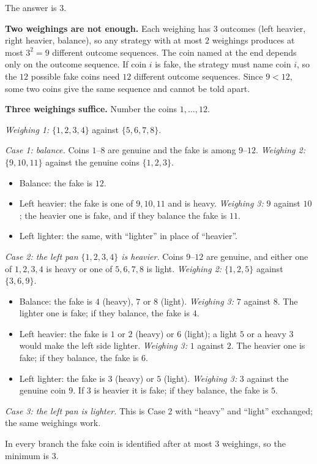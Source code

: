 The answer is $\boxed{3}$.

\textbf{Two weighings are not enough.} Each weighing has $3$ outcomes (left heavier, right heavier, balance), so any strategy with at most $2$ weighings produces at most $3^2=9$ different outcome sequences. The coin named at the end depends only on the outcome sequence. If coin $i$ is fake, the strategy must name coin $i$, so the $12$ possible fake coins need $12$ different outcome sequences. Since $9<12$, some two coins give the same sequence and cannot be told apart.

\textbf{Three weighings suffice.} Number the coins $1,\dots,12$.

\emph{Weighing 1:} $\{1,2,3,4\}$ against $\{5,6,7,8\}$.

\emph{Case 1: balance.} Coins $1$--$8$ are genuine and the fake is among $9$--$12$. \emph{Weighing 2:} $\{9,10,11\}$ against the genuine coins $\{1,2,3\}$.
\begin{itemize}
\item Balance: the fake is $12$.
\item Left heavier: the fake is one of $9,10,11$ and is heavy. \emph{Weighing 3:} $9$ against $10$; the heavier one is fake, and if they balance the fake is $11$.
\item Left lighter: the same, with ``lighter'' in place of ``heavier''.
\end{itemize}

\emph{Case 2: the left pan $\{1,2,3,4\}$ is heavier.} Coins $9$--$12$ are genuine, and either one of $1,2,3,4$ is heavy or one of $5,6,7,8$ is light. \emph{Weighing 2:} $\{1,2,5\}$ against $\{3,6,9\}$.
\begin{itemize}
\item Balance: the fake is $4$ (heavy), $7$ or $8$ (light). \emph{Weighing 3:} $7$ against $8$. The lighter one is fake; if they balance, the fake is $4$.
\item Left heavier: the fake is $1$ or $2$ (heavy) or $6$ (light); a light $5$ or a heavy $3$ would make the left side lighter. \emph{Weighing 3:} $1$ against $2$. The heavier one is fake; if they balance, the fake is $6$.
\item Left lighter: the fake is $3$ (heavy) or $5$ (light). \emph{Weighing 3:} $3$ against the genuine coin $9$. If $3$ is heavier it is fake; if they balance, the fake is $5$.
\end{itemize}

\emph{Case 3: the left pan is lighter.} This is Case 2 with ``heavy'' and ``light'' exchanged; the same weighings work.

In every branch the fake coin is identified after at most $3$ weighings, so the minimum is $3$.
